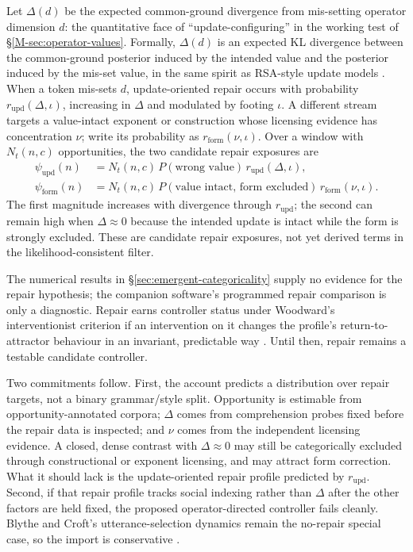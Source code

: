 Let $\Delta(d)$ be the expected common-ground divergence from mis-setting
operator dimension $d$: the quantitative face of \enquote{update-configuring}
in the working test of \S\ref{M-sec:operator-values}. Formally, $\Delta(d)$ is an
expected KL divergence between the common-ground posterior induced by the
intended value and the posterior induced by the mis-set value, in the same
spirit as RSA-style update models \citep{GoodmanFrank2016}. When a token
mis-sets $d$, update-oriented repair occurs with probability
$r_{\mathrm{upd}}(\Delta,\iota)$, increasing in $\Delta$ and modulated by
footing $\iota$. A different stream targets a value-intact exponent or
construction whose licensing evidence has concentration $\nu$; write its
probability as $r_{\mathrm{form}}(\nu,\iota)$. Over a window with
$N_t(n,c)$ opportunities, the two candidate repair exposures are
\begin{equation}
\begin{aligned}
\psi_{\mathrm{upd}}(n)
  &=N_t(n,c)\,P(\text{wrong value})\,
    r_{\mathrm{upd}}(\Delta,\iota),\\
\psi_{\mathrm{form}}(n)
  &=N_t(n,c)\,P(\text{value intact, form excluded})\,
    r_{\mathrm{form}}(\nu,\iota).
\end{aligned}
\label{eq:repair-flow}
\end{equation}
The first magnitude increases with divergence through $r_{\mathrm{upd}}$; the
second can remain high when $\Delta\approx0$ because the intended update is
intact while the form is strongly excluded. These are candidate repair
exposures, not yet derived terms in the likelihood-consistent filter.

The numerical results in \S\ref{sec:emergent-categoricality} supply no evidence
for the repair hypothesis; the companion software's programmed repair
comparison is only a diagnostic. Repair earns controller status under
Woodward's interventionist criterion if an
intervention on it changes the profile's return-to-attractor behaviour in an
invariant, predictable way \citep{woodward2001,
woodward2003MakingThingsHappen}. Until then, repair remains a testable candidate
controller.

Two commitments follow. First, the account predicts a distribution over repair
targets, not a binary grammar/style split. Opportunity is estimable from
opportunity-annotated corpora; $\Delta$ comes from comprehension probes fixed
before the repair data is inspected; and $\nu$ comes from the independent
licensing evidence. A closed, dense contrast with $\Delta\approx0$ may still be
categorically excluded through constructional or exponent licensing, and may
attract form correction. What it should lack is the update-oriented
repair profile predicted by $r_{\mathrm{upd}}$. Second, if that repair profile
tracks social indexing rather than $\Delta$ after the other factors are held
fixed, the proposed operator-directed controller fails cleanly. Blythe and
Croft's utterance-selection dynamics remain the no-repair special case, so the
import is conservative \autocite{BlytheCroft2012}.

